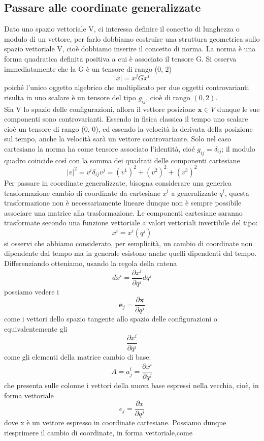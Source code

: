 \documentclass[
10pt, %
a4paper, %
oneside, %
headinclude,footinclude, %
BCOR5mm, %
]{scrartcl}
\begin{document}
\subsection{Passare alle coordinate generalizzate}
Dato uno spazio vettoriale V, ci interessa definire il concetto di lunghezza o modulo di un vettore, per farlo dobbiamo costruire una struttura geometrica sullo spazio vettoriale V, cioè dobbiamo inserire il concetto di norma. La norma è una forma quadratica definita positiva a cui è associato il tensore G. Si osserva immediatamente che la G è un tensore di rango (0, 2)
\[|{x}| = x^jGx^i\]
poiché l'unico oggetto algebrico che moltiplicato per due oggetti controvarianti risulta in uno scalare è un tensore del tipo \(g_{ij}\), cioè di rango \((0, 2)\).\\
Sia V lo spazio delle configurazioni, allora il vettore posizione $\mathbf{x}\in V$ dunque le sue componenti sono controvarianti. Essendo in fisica classica il tempo uno scalare cioè un tensore di rango (0, 0), ed essendo la velocità la derivata della posizione sul tempo, anche la velocità sarà un vettore controvariante. Solo nel caso cartesiano la norma ha come tensore associato l'identità, cioé \(g_{ij} = \delta_{ij}\); il modulo quadro coincide così con la somma dei quadrati delle componenti cartesiane
\[|v|^2 = v^i \delta_{ij} v^j = (v^1)^2+(v^2)^2+(v^3)^2\]
Per passare in coordinate generalizzate, bisogna considerare una generica trasformazione cambio di coordinate da cartesiane \(x^i\) a generalizzate \(q^i\), questa trasformazione non è necessariamente lineare dunque non è sempre possibile associare una matrice alla trasformazione. Le componenti cartesiane saranno trasformate secondo una funzione vettoriale a valori vettoriali invertibile del tipo:
\[ x^i = x^i(q^j)\]
si osservi che abbiamo considerato, per semplicità, un cambio di coordinate non dipendente dal tempo ma in generale esistono anche quelli dipendenti dal tempo.
Differenziando otteniamo, usando la regola della catena
\[dx^i = \frac{\partial x^i}{\partial q^j}dq^j\]
possiamo vedere i
\[\mathbf{e}_j = \frac{\partial \mathbf{x}}{\partial q^j}\]
come i vettori dello spazio tangente allo spazio delle configurazioni
o equivalentemente gli
\[\frac{\partial x^i}{\partial q^j}\]
come gli elementi della matrice cambio di base:
\[A = a^i_j = \frac{\partial x^i}{\partial q^j}\]
che presenta sulle colonne i vettori della nuova base espressi nella vecchia, cioè, in forma vettoriale
\[e_j = \frac{\partial x}{\partial q^j}\]
dove x è un vettore espresso in coordinate cartesiane. Possiamo dunque riesprimere il cambio di coordinate, in forma vettoriale,come
\end{document}
